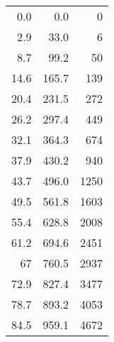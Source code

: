 \begin{table}
{\begin{tabular}{rrr}
                \cmidrule(r){1-1}\cmidrule(lr){2-2}\cmidrule(l){3-3}
                0.0  & 0.0  & 0 \\
                2.9  & 33.0  & 6 \\
                8.7  & 99.2  & 50 \\
                14.6  & 165.7 & 139 \\
                20.4  & 231.5 & 272 \\
                26.2  & 297.4 & 449 \\
                32.1  & 364.3 & 674 \\
                37.9  & 430.2 & 940 \\
                43.7  & 496.0 & 1250 \\
                49.5  & 561.8 & 1603 \\
                55.4  & 628.8 & 2008 \\
                61.2  & 694.6 & 2451 \\
                67    & 760.5 & 2937 \\
                72.9  & 827.4 & 3477 \\
                78.7  & 893.2 & 4053 \\
                84.5  & 959.1 & 4672 \\
                \bottomrule
            \end{tabular}%
     }\\[1cm]
\end{table}
